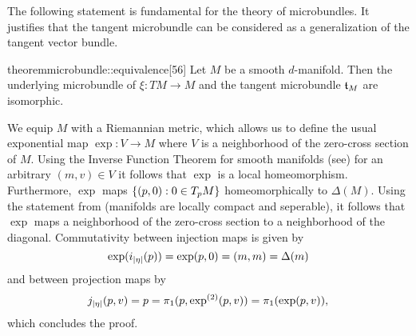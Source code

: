 \begin{myparagraph}
    The following statement is fundamental for the theory of microbundles.
    It justifies that the tangent microbundle can be considered
    as a generalization of the tangent vector bundle.
\end{myparagraph}

\begin{mystatement}{theorem}{microbundle::equivalence}[56]
    Let $M$ be a smooth $d$-manifold.
    Then the underlying microbundle of $\xi: TM \to M$ and the tangent microbundle $\mathfrak{t}_M$
    are isomorphic. 
\end{mystatement}

\begin{myproof}
    We equip $M$ with a Riemannian metric,
    which allows us to define the usual 
    exponential map $\exp: V \to M$ where $V$ is a neighborhood
    of the zero-cross section of $M$.
    Using the Inverse Function Theorem for smooth manifolds (see\cite[thm.4.5]{lee})
    for an arbitrary $(m, v) \in V$ it follows that $\exp$ is a local homeomorphism.
    Furthermore,
    $\exp$ maps $\{(p, 0):0 \in T_pM\}$ homeomorphically to $\Delta(M)$.
    Using the statement from \cite[lm.4.1]{whitehead} (manifolds are locally compact and seperable),
    it follows that $\exp$ maps a neighborhood
    of the zero-cross section to a neighborhood of the diagonal.
    Commutativity between injection maps is given by
    \[ \exp(i_{\vert{} \eta \vert{}}(p)) = \exp(p, 0) = (m, m) = \Delta(m) \]
    and between projection maps by
    \[ j_{\vert{} \eta \vert{}}(p, v) = p = \pi_1(p, \exp^{(2)}(p, v)) = \pi_1(\exp(p, v)), \]
    which concludes the proof.
\end{myproof}